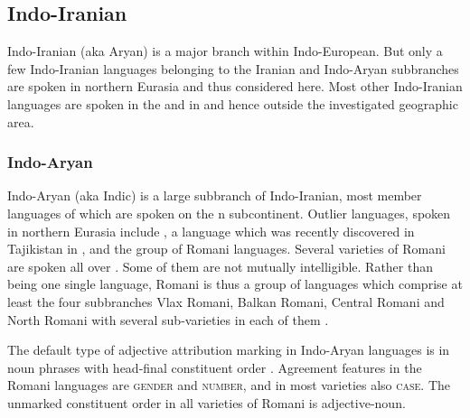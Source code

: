 \subsection{Indo-Iranian}
Indo-Iranian (aka Aryan) is a major branch within Indo-European. But only a few Indo-Iranian languages belonging to the Iranian and Indo-Aryan subbranches are spoken in northern Eurasia and thus considered here. Most other Indo-Iranian languages are spoken in the  and in  and hence outside the investigated geographic area. 

\subsubsection{Indo-Aryan}
Indo-Aryan (aka Indic) is a large subbranch of Indo-Iranian, most member languages of which are spoken on the n subcontinent. Outlier languages, spoken in northern Eurasia include , a language which was recently discovered in Tajikistan in  \citep[22]{masica1991}, and the group of Romani languages. Several varieties of Romani are spoken all over . Some of them are not mutually intelligible. Rather than being one single language, Romani is thus a group of languages which comprise at least the four subbranches Vlax Romani, Balkan Romani, Central Romani and North Romani with several sub-varieties in each of them \citep[2–3]{halwachs-etal2002}.

The default type of adjective attribution marking in Indo-Aryan languages is  in noun phrases with head-final constituent order \citep[369]{masica1991}. Agreement features in the Romani languages are \textsc{gender} and \textsc{number}, and in most varieties also \textsc{case}. The unmarked constituent order in all varieties of Romani is adjective-noun.

